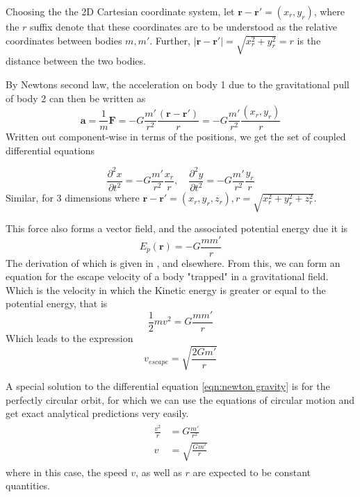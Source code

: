 \documentclass[10pt,showpacs,preprintnumbers,amsmath,amssymb,nofootinbib,aps,prl,twocolumn,groupedaddress,superscriptaddress,showkeys]{revtex4-1}
\begin{document}
    Choosing the the 2D Cartesian coordinate system, let $\mathbf r - \mathbf r'= (x_{r}, y_{r})$, where the $r$ suffix denote that these coordinates are to be understood as the relative coordinates between bodies $m, m'$.
    Further, $|\mathbf r - \mathbf r'| = \sqrt{x_r^2 + y_r^2} = r$ is the distance between the two bodies.

    By Newtons second law, the acceleration on body 1 due to the gravitational pull of body 2 can then be written as
    \begin{equation}
      \mathbf a = \frac{1}{m}\mathbf F = -G \frac{m'}{r^2}\frac{(\mathbf r-\mathbf r')}{r} = -G\frac{m'}{r^2}\frac{\left(x_r, y_r\right)}{r}
    \end{equation}
    Written out component-wise in terms of the positions, we get the set of coupled differential equations

    \begin{equation}
      \frac{\partial^2 x}{\partial t^2} = -G\frac{m'}{r^2}\frac{x_r}{r}, \quad
      \frac{\partial^2 y}{\partial t^2} = -G\frac{m'}{r^2}\frac{y_r}{r}
    \end{equation}
    Similar, for 3 dimensions where $\mathbf r - \mathbf r' = (x_r, y_r, z_r), r=\sqrt{x_r^2 + y_r^2 + z_r^2}$.

    This force also forms a vector field, and the associated potential energy due it is
    \begin{equation}
      E_p(\mathbf r) = -G\frac{mm'}{r}
    \end{equation}
    The derivation of which is given in \cite{elem}, and elsewhere.
    From this, we can form an equation for the escape velocity of a body "trapped" in a gravitational field. Which is the velocity in which the Kinetic energy is greater or equal to the potential energy, that is
    \begin{equation}
      \frac{1}{2}m v^2 = G\frac{mm'}{r}
    \end{equation}
    Which leads to the expression
    \begin{equation}
      v_{escape} = \sqrt{\frac{2Gm'}{r}}
      \label{eqn:escapevel}
    \end{equation}

    A special solution to the differential equation \ref{eqn:newton gravity} is for the perfectly circular orbit, for which we can use the equations of circular motion and get exact analytical predictions very easily. 
    \begin{align}
    \begin{split}
      \frac{v^2}{r} &= G\frac{m'}{r^2}
      \\ v &= \sqrt{\frac{Gm'}{r}}
    \end{split}
    \end{align}
    where in this case, the speed $v$, as well as $r$ are expected to be constant quantities.
\end{document}
